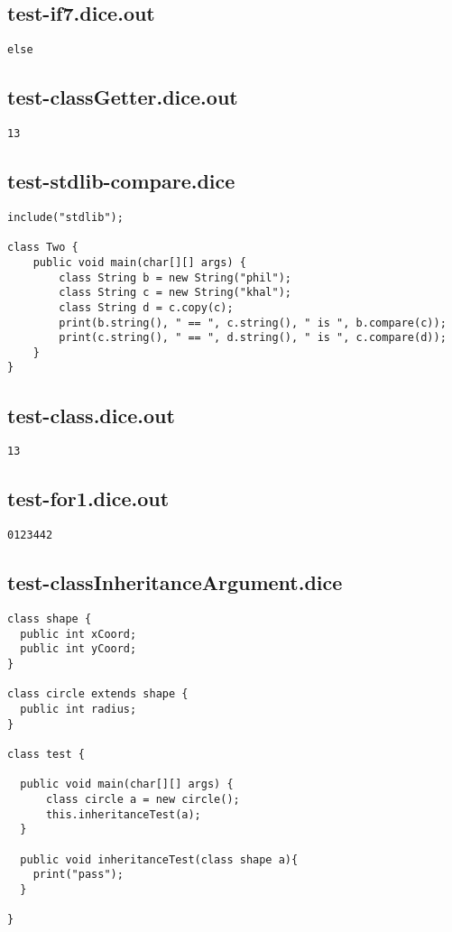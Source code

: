 \subsection{test-if7.dice.out}
\begin{verbatim}
else
\end{verbatim}
\pagebreak
\subsection{test-classGetter.dice.out}
\begin{verbatim}
13
\end{verbatim}
\pagebreak
\subsection{test-stdlib-compare.dice}
\begin{verbatim}
include("stdlib");

class Two {
	public void main(char[][] args) {
        class String b = new String("phil");
        class String c = new String("khal");
        class String d = c.copy(c);
        print(b.string(), " == ", c.string(), " is ", b.compare(c));
        print(c.string(), " == ", d.string(), " is ", c.compare(d));
	}
}

\end{verbatim}
\pagebreak
\subsection{test-class.dice.out}
\begin{verbatim}
13
\end{verbatim}
\pagebreak
\subsection{test-for1.dice.out}
\begin{verbatim}
0123442
\end{verbatim}
\pagebreak
\subsection{test-classInheritanceArgument.dice}
\begin{verbatim}
class shape {
  public int xCoord;
  public int yCoord;
}

class circle extends shape {
  public int radius;
}

class test {

  public void main(char[][] args) {
      class circle a = new circle(); 
      this.inheritanceTest(a);
  }

  public void inheritanceTest(class shape a){
    print("pass");
  }

}
\end{verbatim}
\pagebreak
